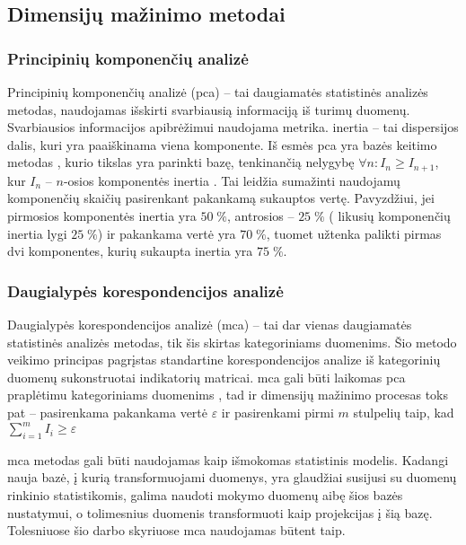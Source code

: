 \subsection{Dimensijų mažinimo metodai}

\subsubsection{Principinių komponenčių analizė}

Principinių komponenčių analizė (\gls{pca}) -- tai daugiamatės statistinės analizės metodas, naudojamas išskirti svarbiausią informaciją iš turimų duomenų. Svarbiausios informacijos apibrėžimui naudojama  metrika. \Gls{inertia} -- tai dispersijos dalis, kuri yra paaiškinama viena komponente. Iš esmės \gls{pca} yra bazės keitimo metodas , kurio tikslas yra parinkti bazę, tenkinančią nelygybę $\forall n: I_n \ge I_{n+1}$, kur $I_n$ -- $n$-osios komponentės \gls{inertia} \cite{abdiPrincipalComponentAnalysis2010}. Tai leidžia sumažinti naudojamų komponenčių skaičių pasirenkant pakankamą sukauptos  vertę. Pavyzdžiui, jei pirmosios komponentės \gls{inertia} yra $50\;\%$, antrosios -- $25\;\%$ (\rightarrow \; likusių komponenčių \gls{inertia} lygi $25\;\%$) ir pakankama  vertė yra $70\;\%$, tuomet užtenka palikti pirmas dvi komponentes, kurių sukaupta \gls{inertia}  yra $75\;\%$.

\subsubsection{Daugialypės korespondencijos analizė}\label{sec:literature:mca}

Daugialypės korespondencijos analizė (\gls{mca}) -- tai dar vienas daugiamatės statistinės analizės metodas, tik šis skirtas kategoriniams duomenims. Šio metodo veikimo principas pagrįstas standartine korespondencijos analize  iš kategorinių duomenų sukonstruotai indikatorių matricai. \gls{mca} gali būti laikomas \gls{pca} praplėtimu kategoriniams duomenims \cite{abdiMultipleCorrespondenceAnalysis2007}, tad ir dimensijų mažinimo procesas toks pat -- pasirenkama pakankama  vertė $\varepsilon$ ir pasirenkami pirmi $m$ stulpelių taip, kad $\sum_{i=1}^m{I_i} \ge \varepsilon$

\gls{mca} metodas gali būti naudojamas kaip išmokomas statistinis modelis. Kadangi nauja bazė, į kurią transformuojami duomenys, yra glaudžiai susijusi su duomenų rinkinio statistikomis, galima naudoti mokymo duomenų aibę šios bazės nustatymui, o tolimesnius duomenis transformuoti kaip projekcijas į šią bazę. Tolesniuose šio darbo skyriuose \gls{mca} naudojamas būtent taip.